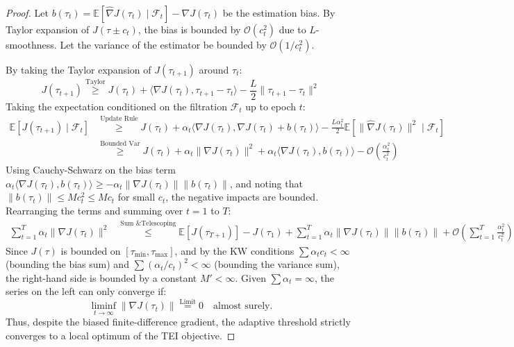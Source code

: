 \documentclass{article}
\begin{document}
\begin{proof}
Let $b(\tau_t) = \mathbb{E}[\hat{\nabla} J(\tau_t) \mid \mathcal{F}_t] - \nabla J(\tau_t)$ be the estimation bias. By Taylor expansion of $J(\tau \pm c_t)$, the bias is bounded by $\mathcal{O}(c_t^2)$ due to $L$-smoothness. Let the variance of the estimator be bounded by $\mathcal{O}(1/c_t^2)$.

By taking the Taylor expansion of $J(\tau_{t+1})$ around $\tau_t$:
\begin{equation}
    J(\tau_{t+1}) \overset{\text{Taylor}}{\ge} J(\tau_t) + \langle \nabla J(\tau_t), \tau_{t+1} - \tau_t \rangle - \frac{L}{2} \|\tau_{t+1} - \tau_t\|^2
\end{equation}
Taking the expectation conditioned on the filtration $\mathcal{F}_t$ up to epoch $t$:
\begin{align}
    \mathbb{E}[J(\tau_{t+1}) \mid \mathcal{F}_t] &\overset{\text{Update Rule}}{\ge} J(\tau_t) + \alpha_t \langle \nabla J(\tau_t), \nabla J(\tau_t) + b(\tau_t) \rangle - \frac{L \alpha_t^2}{2} \mathbb{E}[\|\hat{\nabla} J(\tau_t)\|^2 \mid \mathcal{F}_t] \\
    &\overset{\text{Bounded Var}}{\ge} J(\tau_t) + \alpha_t \|\nabla J(\tau_t)\|^2 + \alpha_t \langle \nabla J(\tau_t), b(\tau_t) \rangle - \mathcal{O}\left( \frac{\alpha_t^2}{c_t^2} \right)
\end{align}
Using Cauchy-Schwarz on the bias term $\alpha_t \langle \nabla J(\tau_t), b(\tau_t) \rangle \ge - \alpha_t \|\nabla J(\tau_t)\| \|b(\tau_t)\|$, and noting that $\|b(\tau_t)\| \le M c_t^2 \le M c_t$ for small $c_t$, the negative impacts are bounded.
Rearranging the terms and summing over $t=1$ to $T$:
\begin{align}
    \sum_{t=1}^T \alpha_t \|\nabla J(\tau_t)\|^2 &\overset{\text{Sum \& Telescoping}}{\le} \mathbb{E}[J(\tau_{T+1})] - J(\tau_1) + \sum_{t=1}^T \alpha_t \|\nabla J(\tau_t)\| \|b(\tau_t)\| + \mathcal{O}\left( \sum_{t=1}^T \frac{\alpha_t^2}{c_t^2} \right)
\end{align}
Since $J(\tau)$ is bounded on $[\tau_{\min}, \tau_{\max}]$, and by the KW conditions $\sum \alpha_t c_t < \infty$ (bounding the bias sum) and $\sum (\alpha_t / c_t)^2 < \infty$ (bounding the variance sum), the right-hand side is bounded by a constant $M' < \infty$. Given $\sum \alpha_t = \infty$, the series on the left can only converge if:
\begin{equation}
    \liminf_{t \to \infty} \|\nabla J(\tau_t)\| \overset{\text{Limit}}{=} 0 \quad \text{almost surely.}
\end{equation}
Thus, despite the biased finite-difference gradient, the adaptive threshold strictly converges to a local optimum of the TEI objective.
\end{proof}
\end{document}
